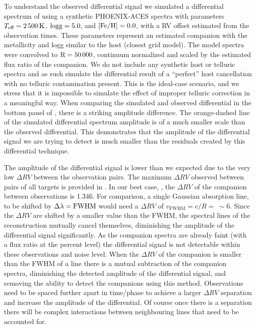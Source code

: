 To understand the observed differential signal we simulated a differential spectrum of  using a synthetic {PHOENIX-ACES} spectra with parameters \(T_{\textrm{eff}} = 2\,500\,\si{\kelvin}{}\), \(\rm logg=5.0\), and \(\rm \feh{}=0.0\), with a {RV} offset estimated from the observation times. These parameters represent an estimated companion \teff{} with the metallicity and logg similar to the host (closest grid model). The model spectra were convolved to \(\rm R=50\,000\), continuum normalized and scaled by the estimated flux ratio of the companion. We do not include any synthetic host or telluric spectra and as such simulate the differential result of a ``perfect'' host cancellation with no telluric contamination present. This is the ideal-case scenario, and we stress that it is impossible to simulate the effect of improper telluric correction in a meaningful way. When comparing the simulated and observed differential in the bottom panel of , there is a striking amplitude difference. The orange-dashed line of the simulated differential spectrum amplitude is of a much smaller scale than the observed differential. This demonstrates that the amplitude of the differential signal we are trying to detect is much smaller than the residuals created by this differential technique.

The amplitude of the differential signal is lower than we expected due to the very low \(\Delta {RV}\) between the observation pairs. The maximum \(\Delta {RV}\) observed between pairs of all targets is provided in .
In our best case, ,  the \(\Delta {RV}\) of the companion between observations is 1.346\kmps{}. For comparison, a single Gaussian absorption line, to be shifted by \(\Delta\lambda = \rm {FWHM}\) would need a \(\Delta {RV}\) of \(v_{\textrm{FWHM}} = c/R =~\sim6\)\kmps{}. Since the \(\Delta {RV}\) are shifted by a smaller value than the {FWHM}, the spectral lines of the reconstruction mutually cancel themselves, diminishing the amplitude of the differential signal significantly. As the companion spectra are already faint (with a flux ratio at the percent level) the differential signal is not detectable within these observations and noise level.
When the \(\Delta {RV}\) of the companion is smaller than the {FWHM} of a line there is a mutual subtraction of the companion spectra, diminishing the detected amplitude of the differential signal, and removing the ability to detect the companions using this method. Observations need to be spaced further apart in time/phase to achieve a larger \(\Delta {RV}\) separation and increase the amplitude of the differential. Of course once there is a separation there will be complex interactions between neighbouring lines that need to be accounted for.


